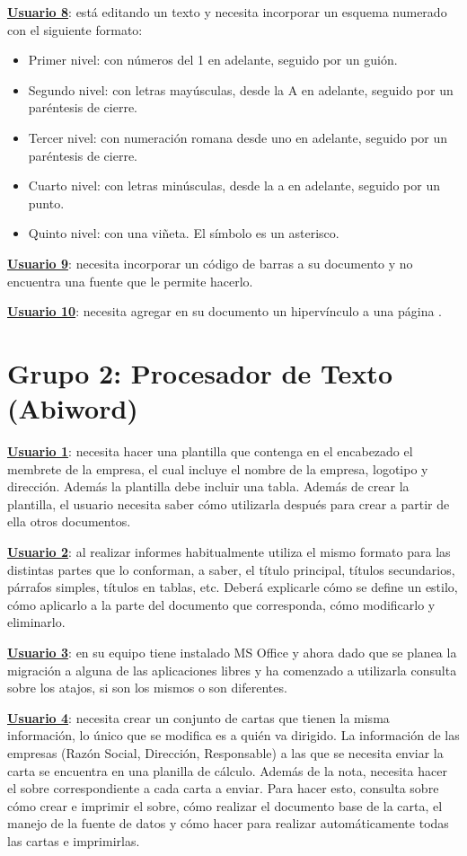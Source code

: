 \documentclass[12pt]{article}
\begin{document}
\textbf{\underline{Usuario 8}}: está editando un texto y necesita incorporar un esquema numerado con el siguiente formato: 
\begin{itemize}
\item Primer nivel: con números del 1 en adelante, seguido por un guión.
\item Segundo nivel: con letras mayúsculas, desde la A en adelante, seguido por un paréntesis de cierre.
\item Tercer nivel: con numeración romana desde uno en adelante, seguido por un paréntesis de cierre.
\item Cuarto nivel: con letras minúsculas, desde la a en adelante, seguido por un punto.
\item Quinto nivel: con una viñeta. El símbolo es un asterisco.
\end{itemize}

\textbf{\underline{Usuario 9}}: necesita incorporar un código de barras a su documento y no encuentra una fuente que le permite hacerlo.

\textbf{\underline{Usuario 10}}: necesita agregar en su documento un hipervínculo a una página .

\section*{\textbf{Grupo 2: Procesador de Texto (Abiword)}}

\textbf{\underline{Usuario 1}}: necesita hacer una plantilla que contenga en el encabezado el membrete de la empresa, el cual incluye el nombre de la empresa, logotipo y dirección. Además la plantilla debe incluir una tabla. 
Además de crear la plantilla, el usuario necesita saber cómo utilizarla después para crear a partir de ella otros documentos.

\textbf{\underline{Usuario 2}}: al realizar informes habitualmente utiliza el mismo formato para las distintas partes que lo conforman, a saber, el título principal, títulos secundarios, párrafos simples, títulos en tablas, etc. Deberá explicarle cómo se define un estilo, cómo aplicarlo a la parte del documento que corresponda, cómo modificarlo y eliminarlo.

\textbf{\underline{Usuario 3}}: en su equipo tiene instalado MS Office y ahora dado que se planea la migración a alguna de las aplicaciones libres y ha comenzado a utilizarla consulta sobre los atajos, si son los mismos o son diferentes.

\textbf{\underline{Usuario 4}}: necesita crear un conjunto de cartas que tienen la misma información, lo único que se modifica es a quién va dirigido. La información de las empresas (Razón Social, Dirección, Responsable) a las que se necesita enviar la carta se encuentra en una planilla de cálculo.
Además de la nota, necesita hacer el sobre correspondiente a cada carta a enviar. Para hacer esto, consulta sobre cómo crear e imprimir el sobre, cómo realizar el documento base de la carta, el manejo de la fuente de datos y cómo hacer para realizar automáticamente todas las cartas e imprimirlas.
\end{document}
